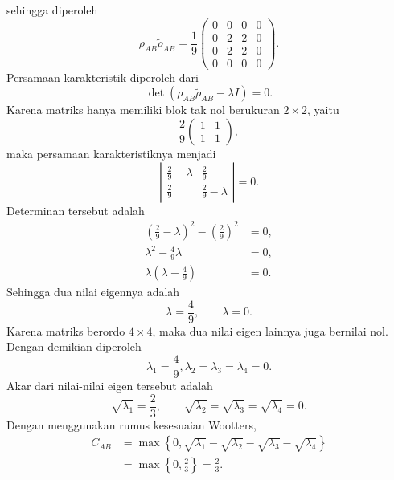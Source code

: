 sehingga diperoleh
\begin{equation}
	\rho_{AB}\tilde{\rho}_{AB}
	=
	\frac{1}{9}
	\begin{pmatrix}
		0&0&0&0\\
		0&2&2&0\\
		0&2&2&0\\
		0&0&0&0
	\end{pmatrix}.
\end{equation}
Persamaan karakteristik diperoleh dari
\begin{equation}
	\det\left(
	\rho_{AB}\tilde{\rho}_{AB}
	-\lambda I
	\right)=0.
\end{equation}
Karena matriks hanya memiliki blok tak nol berukuran $2\times2$, yaitu
\begin{equation}
	\frac{2}{9}
	\begin{pmatrix}
		1&1\\
		1&1
	\end{pmatrix},
\end{equation}
maka persamaan karakteristiknya menjadi
\begin{equation}
	\left|
	\begin{array}{cc}
		\frac{2}{9}-\lambda & \frac{2}{9}\\
		\frac{2}{9} & \frac{2}{9}-\lambda
	\end{array}
	\right|
	=0.
\end{equation}
Determinan tersebut adalah
\begin{align}
	\left(\frac{2}{9}-\lambda\right)^2
	-\left(\frac{2}{9}\right)^2
	&=0,\\
	\lambda^2-\frac{4}{9}\lambda&=0,\\
	\lambda\left(\lambda-\frac{4}{9}\right)&=0.
\end{align}
Sehingga dua nilai eigennya adalah
\begin{equation}
	\lambda=\frac{4}{9},\qquad
	\lambda=0.
\end{equation}
Karena matriks berordo $4\times4$, maka dua nilai eigen lainnya juga bernilai nol. Dengan demikian diperoleh
\begin{equation}
	\lambda_1=\frac{4}{9},\lambda_2=\lambda_3=\lambda_4=0.
\end{equation}
Akar dari nilai-nilai eigen tersebut adalah
\begin{equation}
	\sqrt{\lambda_1}=\frac{2}{3},\qquad
	\sqrt{\lambda_2}=\sqrt{\lambda_3}=\sqrt{\lambda_4}=0.
\end{equation}
Dengan menggunakan rumus kesesuaian Wootters,
\begin{align}
	C_{AB}
	&=
	\max\left\{
	0,
	\sqrt{\lambda_1}
	-\sqrt{\lambda_2}
	-\sqrt{\lambda_3}
	-\sqrt{\lambda_4}
	\right\} \\
	&=
	\max\left\{
	0,
	\frac{2}{3}
	\right\}
	=
	\frac{2}{3}.
\end{align}
